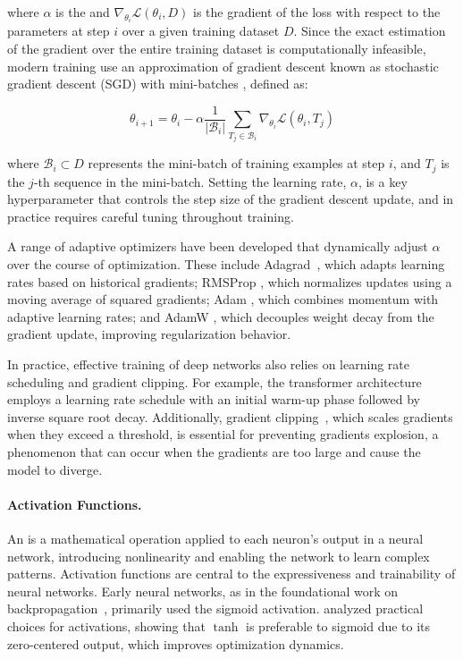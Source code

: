 where $\alpha$ is the  and $\nabla_{\theta_i} \mathcal{L}(\theta_i, D)$ is the gradient of the loss with respect to the parameters at step $i$ over a given training dataset $D$. Since the exact estimation of the gradient over the entire training dataset is computationally infeasible, modern training use an approximation of gradient descent known as stochastic gradient descent (SGD) with mini-batches \citep{robbins1951stochastic}, defined as:

\begin{equation}
    \theta_{i+1} = \theta_i - \alpha  \frac{1}{\lvert \mathcal{B}_i\rvert} \sum_{T_j \in \mathcal{B}_i} \nabla_{\theta_i} \mathcal{L}(\theta_i, T_j)
\end{equation}

where $\mathcal{B}_i \subset D$ represents the mini-batch of training examples at step $i$, and $T_j$ is the $j$-th sequence in the mini-batch. Setting the learning rate, $\alpha$, is a key hyperparameter that controls the step size of the gradient descent update, and in practice requires careful tuning throughout training.

A range of adaptive optimizers have been developed that dynamically adjust $\alpha$ over the course of optimization. These include Adagrad~\citep{duchi2011adaptive}, which adapts learning rates based on historical gradients; RMSProp \citep{tieleman2012lecture}, which normalizes updates using a moving average of squared gradients; Adam \citep{kingma2015adam}, which combines momentum with adaptive learning rates; and AdamW \citep{loshchilov2019decoupled}, which decouples weight decay from the gradient update, improving regularization behavior.

In practice, effective training of deep networks also relies on learning rate scheduling and gradient clipping. For example, the transformer architecture~\citep{vaswani2017attention} employs a learning rate schedule with an initial warm-up phase followed by inverse square root decay. Additionally, gradient clipping~\citep{pascanu2013difficulty}, which scales gradients when they exceed a threshold, is essential for preventing gradients explosion, a phenomenon that can occur when the gradients are too large and cause the model to diverge.

\paragraph{Activation Functions.} 

An  is a mathematical operation applied to each neuron's output in a neural network, introducing nonlinearity and enabling the network to learn complex patterns. Activation functions are central to the expressiveness and trainability of neural networks. Early neural networks, as in the foundational work on backpropagation~\citep{rumelhart1986learning}, primarily used the sigmoid activation. \citet{lecun1998efficient} analyzed practical choices for activations, showing that $\tanh$ is preferable to sigmoid due to its zero-centered output, which improves optimization dynamics.

